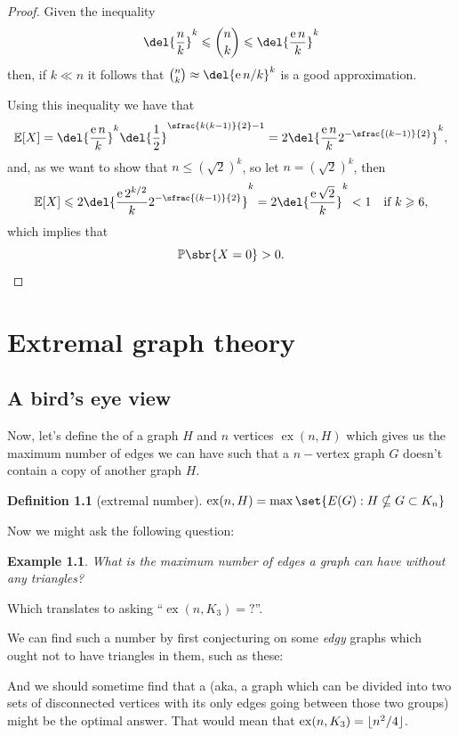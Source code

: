 \documentclass[english, dark, index]{Iart}
\newtheorem{definition}{Definition}[part]
\newtheorem{example}{Example}[chapter]
\DeclareMathOperator{\ex}{ex}
\DeclarePairedDelimiter\floor{\lfloor}{\rfloor}
\begin{document}
\begin{proof}
		Given the inequality \[ \del{\dfrac{n}{k}}^{k}\leqslant\binom{n}{k}\leqslant\del{\dfrac{\mathrm{e}\,n}{k}}^{k} \]
		then, if $ k\ll n $ it follows that $ \binom{n}{k}\approx\del{\mathrm{e}\,n/k}^{k} $ is a good approximation.
		
		Using this inequality we have that
		\[ \mathbb{E}[X]=\del{\dfrac{\mathrm{e}\,n}{k}}^{k}\del{\dfrac{1}{2}}^{\sfrac{k(k-1)}{2}-1}=2\del{\dfrac{\mathrm{e}\,n}{k}2^{-\sfrac{(k-1)}{2}}}^{k}, \]
		and, as we want to show that $ n\leqslant (\sqrt{2})^{k} $, so let $ n=(\sqrt{2})^{k} $, then
		 \[ \mathbb{E}[X]\leqslant 2\del{\dfrac{\mathrm{e}\,2^{k/2}}{k}2^{-\sfrac{(k-1)}{2}}}^{k}=2\del{\dfrac{\mathrm{e}\,\sqrt{2}}{k}}^{k}<1\quad\textup{if }k\geqslant 6, \]
		 which implies that
		 \[ \mathbb{P}\sbr{X=0}>0. \]
	\end{proof}

	\chapter{Extremal graph theory}
	
	\section{A bird's eye view}

	Now, let's define the  of a graph $ H $ and $ n $ vertices $ \ex(n,H) $ which gives us the maximum number of edges we can have such that a $ n- $vertex graph $ G $ doesn't contain a copy of another graph $ H $. 
	\begin{definition}[extremal number]
		$ \ex(n,H)=\max\set{E(G): H\nsubseteq G\subset K_n} $
	\end{definition}

	Now we might ask the following question:
	\begin{example}
		What is the maximum number of edges a graph can have without any triangles?
	\end{example}
	Which translates to asking ``$ \ex(n,K_3)=? $''.
	
	We can find such a number by first conjecturing on some \textit{edgy} graphs which ought not to have triangles in them, such as these:
	
	
	And we should sometime find that a  (aka, a graph which can be divided into two sets of disconnected vertices with its only edges going between those two groups) might be the optimal answer. That would mean that $ \ex(n,K_3)=\floor{n^{2}/4} $.
	
\end{document}

